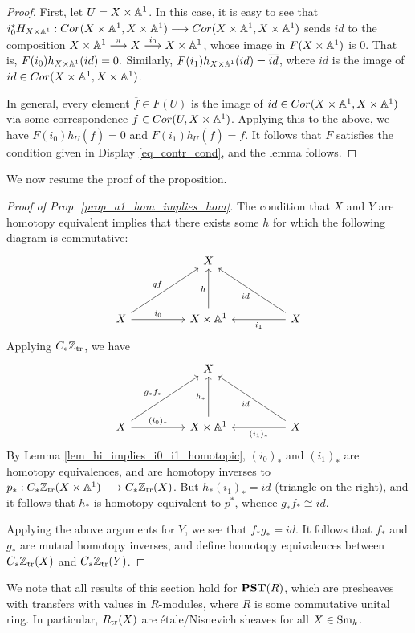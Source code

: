 \begin{proof}
First, let $U = X \times \mathbb{A}^1$. In this case, it is easy to see
that $i_0^* H_{X \times \mathbb{A}^1} : Cor(X \times \mathbb{A}^1, X \times \mathbb{A}^1) 
\longrightarrow Cor( X \times \mathbb{A}^1, X \times \mathbb{A}^1)$ sends $id$ to the 
composition $X \times \mathbb{A}^1 \stackrel{\pi}{\longrightarrow} X 
\stackrel{i_0}{\longrightarrow} X \times \mathbb{A}^1$, whose image in $F(X \times 
\mathbb{A}^1)$ is 0. That is, $F(i_0)h_{X \times \mathbb{A}^1}(id) = 0.$ 
Similarly, $F(i_1)h_{X \times \mathbb{A}^1}(id) = \overline{id}$, where
$\overline{id}$ is the image of $id \in Cor(X \times \mathbb{A}^1, X 
\times \mathbb{A}^1)$. 

In general, every element $\overline{f} \in F(U)$ is the image
of $id \in Cor(X \times \mathbb{A}^1, X \times \mathbb{A}^1)$ via some 
correspondence $f \in Cor(U, X \times \mathbb{A}^1)$. Applying this
to the above, we have $F(i_0)h_U(\overline{f}) = 0$ and $F(i_1)
h_U(\overline{f}) = \overline{f}$. It follows that $F$ satisfies
the condition given in Display \ref{eq_contr_cond}, and the lemma
follows.
\end{proof}

We now resume the proof of the proposition.

\begin{proof}[Proof of Prop. \ref{prop_a1_hom_implies_hom}]
The condition that $X$ and $Y$ are homotopy equivalent implies
that there exists some $h$ for which the following diagram is
commutative:
\[
\begin{tikzcd}[column sep=huge, row sep=huge]
{}& X \\
X \arrow{ru}{gf} \arrow{r}{i_0} &
X \times \A^1 \arrow{u}{h} &
X \arrow{l}{i_1} \arrow{lu}{id}
\end{tikzcd}
\]
Applying $C_{*} \mathbb{Z}_{\mathrm{tr}}$, we have
\[
\begin{tikzcd}[column sep=huge, row sep=huge]
{}& X \\
X \arrow{ru}{g_*f_*} \arrow{r}{(i_0)_*} &
X \times \A^1 \arrow{u}{h_*} &
X \arrow{l}{(i_1)_*} \arrow{lu}{id}
\end{tikzcd}
\]
By Lemma \ref{lem_hi_implies_i0_i1_homotopic}, $(i_0)_*$ and 
$(i_1)_*$ are homotopy equivalences, and are homotopy inverses to 
$p_* : C_{*} \mathbb{Z}_{\mathrm{tr}}(X \times \mathbb{A}^1) \longrightarrow C_{*} \mathbb{Z}_{\mathrm{tr}}(X)$. But 
$h_* (i_1)_* = id$ (triangle on the right), and it follows that 
$h_*$ is homotopy equivalent to $p^*$, whence $g_*f_* \cong id$.

Applying the above arguments for $Y$, we see that $f_*g_* = id$.
It follows that $f_*$ and $g_*$ are mutual homotopy inverses, and
define homotopy equivalences between $C_{*} \mathbb{Z}_{\mathrm{tr}}(X)$ and $C_{*}
\mathbb{Z}_{\mathrm{tr}}(Y)$.
\end{proof}

\begin{rmk}
We note that all results of this section hold for $\mathbf{PST}(R)$, which
are presheaves with transfers with values in $R$-modules, where $R$
is some commutative unital ring. In particular, $R_{\mathrm{tr}}(X)$ are
\'etale/Nisnevich sheaves for all $X \in \mathrm{Sm}_{k}$.
\end{rmk}
